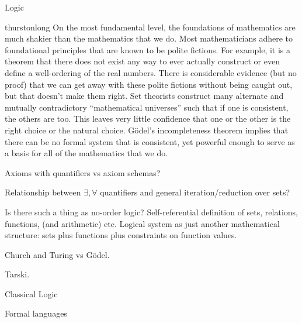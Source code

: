 \begin{plSection}{Logic}
\label{sec:Logic}

\begin{plQuote}
{}
{thurstonlong}
{On the most fundamental level, the foundations of mathematics are much shakier
than the mathematics that we do. Most mathematicians adhere to foundational
principles that are known to be polite fictions. For example, it is a theorem that
there does not exist any way to ever actually construct or even define a well-ordering
of the real numbers. There is considerable evidence (but no proof) that we can get
away with these polite fictions without being caught out, but that doesn’t make
them right. Set theorists construct many alternate and mutually contradictory
“mathematical universes” such that if one is consistent, the others are too. This
leaves very little confidence that one or the other is the right choice or the natural
choice. G\"odel’s incompleteness theorem implies that there can be no formal system
that is consistent, yet powerful enough to serve as a basis for all of the mathematics
that we do.}%
\end{plQuote}



Axioms with quantifiers vs axiom schemas?

Relationship between $\exists, \forall$ quantifiers
and general iteration/reduction over sets?

Is there such a thing as no-order logic?
Self-referential definition of sets, relations, functions,
(and arithmetic) etc. 
Logical system  as just another mathematical structure:
sets plus functions plus constraints on function values.

Church and Turing vs G\"{o}del.

Tarski.

\begin{plSection}{Classical Logic}
\label{sec:Classical Logic}

\cite{sep:ClassicalLogic}

\end{plSection}%
\begin{plSection}{Formal languages}
\label{sec:Formal_languages}


\end{plSection}
\end{plSection}

